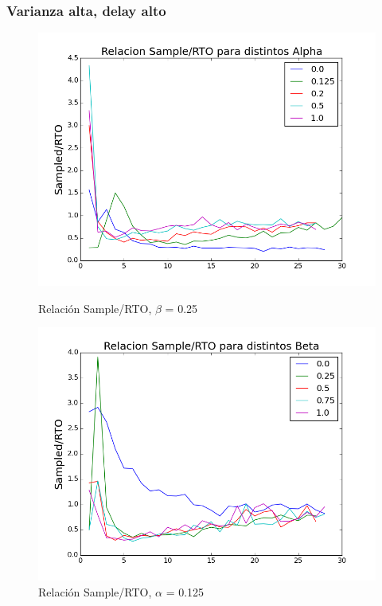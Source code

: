 \subsubsection{Varianza alta, delay alto}

\begin{figure}[H]
\begin{minipage}{0.5\linewidth}
\includegraphics[width=\linewidth]{../graficos/alphad025var5drop0.png}
\caption{Relación Sample/RTO, $\beta$ = 0.25}\label{fig:alpha-var5-drop0-alto}
\end{minipage}
\hfill
\begin{minipage}{0.5\linewidth}
\includegraphics[width=\linewidth]{../graficos/betad025var5drop0.png}
\caption{Relación Sample/RTO, $\alpha$ = 0.125}\label{fig:beta-var5-drop0-alto}
\end{minipage}
\end{figure}

